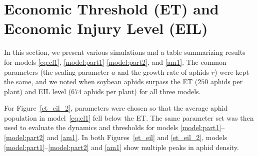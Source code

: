 \documentclass[sn-mathphys-num]{sn-jnl}
\numberwithin{equation}{section}
\numberwithin{equation}{section}
\begin{document}
\section{Economic Threshold (ET) and Economic Injury Level (EIL)}
\label{ET_EIL}
In this section, we present various simulations and a table summarizing results for models \eqref{eq:cl1}, \eqref{model:part1}-\eqref{model:part2}, and
 \eqref{am1}. The common parameters (the scaling parameter $a$ and the growth rate of aphids $r$) were kept the same, and we noted when soybean aphids surpass the ET ($250$ aphids per plant)  and EIL level ($674$ aphids per plant) \cite{ragsdale2011ecology} for all three models.  

 For Figure~\ref{et_eil_2}, parameters were chosen so that the average aphid population in model~\eqref{eq:cl1} fell below the ET. The same parameter set was then used to evaluate the dynamics and thresholds for models \eqref{model:part1}–\eqref{model:part2} and \eqref{am1}. In both Figures~\ref{et_eil} and \ref{et_eil_2}, models \eqref{model:part1}–\eqref{model:part2} and \eqref{am1} show multiple peaks in aphid density.
\end{document}
